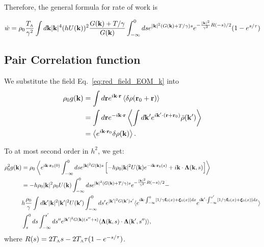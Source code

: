 \documentclass[superscriptaddress, amsmath,preprintnumbers,10pt,article,notitlepage]{revtex4-1}
\newcommand{\A}{\text{\tiny{A}}}
\begin{document}
Therefore, the general formula for rate of work is 

\begin{equation}\label{eq:final_expression_wdot}
\dot{w}  =  \rho_0 \dfrac{T_\A}{\gamma^2} \int d{\bf k} |{\bf k}|^4 (h U({\bf k}))^2 \dfrac{ G({\bf k}) + T/ \gamma}{G({\bf k})}
\int_{-\infty}^0 ds e^{|{\bf k}|^2 ( G({\bf k}) + T/ \gamma)s}  e^{-\frac{|{\bf k}|^2}{\gamma^2} R(-s)/2} (1-e^{s/\tau})
\end{equation}


\subsection{Pair Correlation function}

We substitute  the field Eq.~\eqref{eq:red_field_EOM_k} into
\begin{align*}
\rho_0 g({\bf k}) & = \int d{\bf r} e^{i{\bf k} \cdot{\bf r}} \left \langle  \delta \rho( {\bf r}_0 + {\bf r} ) \right \rangle \\ 
& =  \int d{\bf r} e^{-i{\bf k} \cdot{\bf r}} \left \langle   \int d{\bf k}' e^{i{\bf k}' \cdot( {\bf r} +  {\bf r}_0) } \bar{\rho}({\bf k}') \right \rangle \\ 
& =  \left \langle  e^{i{\bf k} \cdot {\bf r}_0 } \delta \rho({\bf k}) \right \rangle. 
\end{align*}

To at most second order in $h^2$, we get:
\begin{align*}
\rho^2_0 g({\bf k}) & =  \rho_0 \left \langle e^{i{\bf k} \cdot {\bf r}_0(0) }  \int_{-\infty}^0 ds e^{|{\bf k}|^2 G({\bf k})s}  \left[ -h \rho_0 |{\bf k}|^2 U({\bf k}) e^{-i{\bf k} \cdot {\bf r}_0(s)} + i{\bf k}\cdot  {\bm \Lambda}({\bf k}, s) \right] \right \rangle \\
& = - h \rho_0 |{\bf k}|^2 \rho_0  U({\bf k}) \int
_{-\infty}^0 ds e^{|{\bf k}|^2 ( G({\bf k}) + T/ \gamma)s}  e^{-\frac{|{\bf k}|^2}{\gamma^2} R(-s)/2} - \\
&  h \dfrac{\rho_0}{\gamma}  \int d{\bf k}'  |{\bf k}|^2 |{\bf k}'|^2 U({\bf k}') \int_{-\infty}^0 ds' e^{ |{\bf k}'|^2 G({\bf k}') s'}  \langle e^{i{\bf k}\cdot \int_{-\infty}^0 [1/\gamma {\bf f}_0(x) + {\bm \xi}_0(x) ]dx}  e^{i{\bf k}'\cdot \int_{-\infty}^{s'} [1/\gamma {\bf f}_0(x) + {\bm \xi}_0(x)] dx}    \rangle \\
& \int_{s}^{0} ds  \int_{-\infty}^{s'} ds'' e^{ |{\bf k}'|^2 G({\bf k}) (s''+s)}  \langle {\bm \Lambda}({\bf k}, s) \cdot {\bm \Lambda}({\bf k}', s'')\rangle ,
\end{align*} where $R(s)=2T_\A s - 2T_\A \tau (1- e^{-s/\tau})$.
\end{document}
